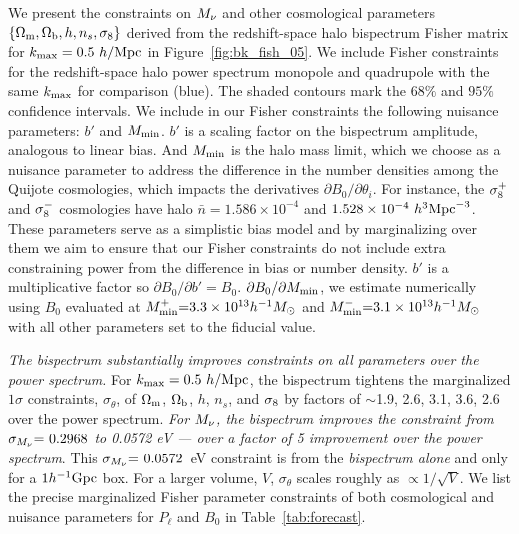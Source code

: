 We present the constraints on $M_\nu$ and other cosmological parameters 
$\{\Omega_{\rm m}, \Omega_{\rm b}, h, n_s, \sigma_8\}$ derived from the redshift-space halo bispectrum 
Fisher matrix for $k_{\rm max} = 0.5~h/{\rm Mpc}$ in Figure~\ref{fig:bk_fish_05}. 
We include Fisher constraints for the redshift-space halo power spectrum 
monopole and quadrupole with the same $k_{\rm max}$ for comparison (blue). 
The shaded contours mark the $68\%$ and $95\%$ confidence intervals. We include 
in our Fisher constraints the following nuisance parameters: $b'$ and $M_{\rm min}$. 
$b'$ is a scaling factor on the bispectrum amplitude, analogous to linear bias. 
And $M_{\rm min}$ is the halo mass limit, which we choose as a nuisance
parameter to address the difference in the number densities among the Quijote
cosmologies, which impacts the derivatives $\partial B_0/\partial \theta_i$. 
For instance, the $\sigma_8^{+}$ and $\sigma_8^{-}$ cosmologies have halo 
$\bar{n} = 1.586\times10^{-4}$ and $1.528 \times 10^{-4}~h^{3}{\rm Mpc}^{-3}$. 
These parameters serve as a simplistic bias model and by marginalizing 
over them we aim to ensure that our Fisher constraints do not include extra 
constraining power from the difference in bias or number density. $b'$ is a 
multiplicative factor so $\partial B_0/\partial b' = B_0$. 
$\partial B_0/\partial M_{\rm min}$, we estimate numerically using 
$B_0$ evaluated at $M^{+}_{\rm min}{=}3.3\times10^{13}h^{-1}M_\odot$ 
and $M^{-}_{\rm min}{=}3.1\times10^{13}h^{-1}M_\odot$ with all other parameters 
set to the fiducial value. 

{\em The bispectrum substantially improves constraints on all parameters 
over the power spectrum.} For $k_{\rm max} = 0.5~h/{\rm Mpc}$, the 
bispectrum tightens the marginalized $1\sigma$ constraints, $\sigma_\theta$, of $\Omega_{\rm m}$, 
$\Omega_{\rm b}$, $h$, $n_s$, and $\sigma_8$ by factors of $\sim$1.9, 2.6, 3.1, 3.6, 2.6 over 
the power spectrum. {\em For $M_\nu$, the bispectrum improves the constraint 
from $\sigma_{M_\nu}{=}~0.2968$ to 0.0572 eV --- over a factor of 5 improvement 
over the power spectrum}. This $\sigma_{M_\nu}{=}~0.0572$~eV constraint is from 
the {\em bispectrum alone} and only for a $1h^{-1}{\rm Gpc}$ box. For a larger 
volume, $V$, $\sigma_\theta$ scales roughly as $\propto1/\sqrt{V}$. 
We list the precise marginalized Fisher parameter constraints of both cosmological 
and nuisance parameters for $P_\ell$ and $B_0$ in Table~\ref{tab:forecast}. 

